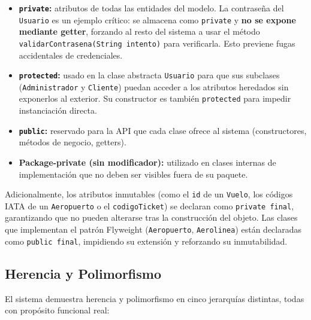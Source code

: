 \documentclass[12pt, letterpaper]{article}
\begin{document}
	\begin{itemize}
		\item \textbf{\texttt{private}:} atributos de todas las entidades del modelo. La contraseña del \texttt{Usuario} es un ejemplo crítico: se almacena como \texttt{private} y \textbf{no se expone mediante getter}, forzando al resto del sistema a usar el método \texttt{validarContrasena(String intento)} para verificarla. Esto previene fugas accidentales de credenciales.
		\item \textbf{\texttt{protected}:} usado en la clase abstracta \texttt{Usuario} para que sus subclases (\texttt{Administrador} y \texttt{Cliente}) puedan acceder a los atributos heredados sin exponerlos al exterior. Su constructor es también \texttt{protected} para impedir instanciación directa.
		\item \textbf{\texttt{public}:} reservado para la API que cada clase ofrece al sistema (constructores, métodos de negocio, getters).
		\item \textbf{Package-private (sin modificador):} utilizado en clases internas de implementación que no deben ser visibles fuera de su paquete.
	\end{itemize}
	
	Adicionalmente, los atributos inmutables (como el \texttt{id} de un \texttt{Vuelo}, los códigos IATA de un \texttt{Aeropuerto} o el \texttt{codigoTicket}) se declaran como \texttt{private final}, garantizando que no pueden alterarse tras la construcción del objeto. Las clases que implementan el patrón Flyweight (\texttt{Aeropuerto}, \texttt{Aerolinea}) están declaradas como \texttt{public final}, impidiendo su extensión y reforzando su inmutabilidad.
	
	\subsection{Herencia y Polimorfismo}
	El sistema demuestra herencia y polimorfismo en cinco jerarquías distintas, todas con propósito funcional real:
	
\end{document}
